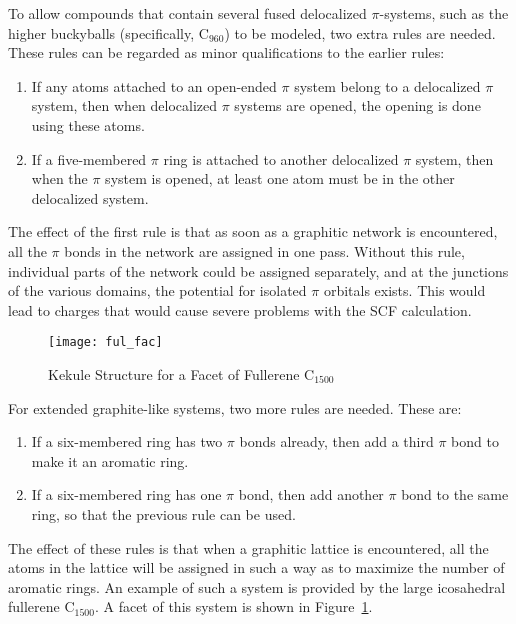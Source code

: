 \begin{description}
To allow compounds that contain several fused delocalized $\pi$-systems, such 
as the higher buckyballs (specifically, C$_{960}$) to be modeled, two extra rules
are needed.  These rules can be regarded as minor qualifications to the earlier
rules:
\begin{enumerate}
\item If any atoms attached to an open-ended $\pi$ system belong to a delocalized
$\pi$ system, then when delocalized $\pi$ systems are opened, the opening is done
using these atoms.
\item If a five-membered $\pi$ ring is attached to another delocalized 
$\pi$ system, then when the $\pi$ system is opened, at least one atom must be
in the other delocalized system.
\end{enumerate}

The effect of the first rule is that as soon as a graphitic network is encountered,
all the $\pi$ bonds in the network are assigned in one pass.  Without this rule,
individual parts of the network could be assigned separately, and at the junctions
of the various domains, the potential for isolated $\pi$ orbitals exists. This would
lead to charges that would cause severe problems with the SCF calculation.

\begin{figure}
\begin{makeimage}
\end{makeimage}
\begin{center}
\texttt{[image: ful\_fac]}
\end{center}
\caption{\label{ful_fac}Kekule Structure for a Facet of Fullerene C$_{1500}$}
\end{figure}

For extended graphite-like systems, two more rules are needed.  These are:
\begin{enumerate}
\item  If a six-membered ring has two $\pi$ bonds already, then
         add a third $\pi$ bond to make it an aromatic ring.
\item If a six-membered ring has one $\pi$ bond, then add another
      $\pi$ bond to the same ring, so that the previous rule can be used.
\end{enumerate}
The effect of these rules is that when a graphitic lattice is encountered, all
the atoms in the lattice will be assigned in such a way as to maximize the
number of aromatic rings.  An example of such a system is provided by the large
icosahedral fullerene C$_{1500}$.  A facet of this system is shown in
Figure~\ref{ful_fac}.


\end{description}
